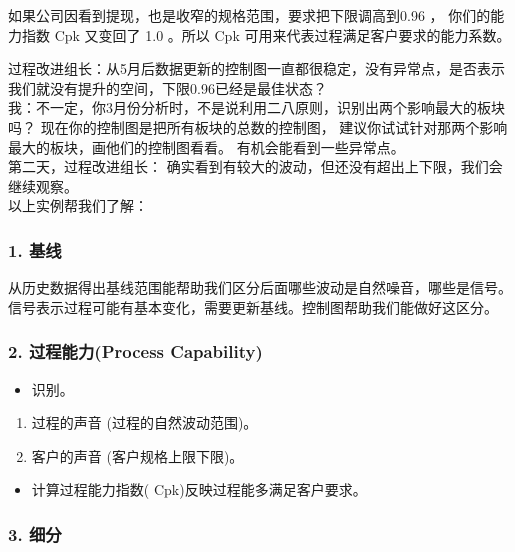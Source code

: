 如果公司因看到提现，也是收窄的规格范围，要求把下限调高到0.96 ，
你们的能力指数 Cpk 又变回了 1.0 。所以 Cpk
可用来代表过程满足客户要求的能力系数。

过程改进组长：从5月后数据更新的控制图一直都很稳定，没有异常点，是否表示我们就没有提升的空间，下限0.96已经是最佳状态？\\
我：不一定，你3月份分析时，不是说利用二八原则，识别出两个影响最大的板块吗？
现在你的控制图是把所有板块的总数的控制图，
建议你试试针对那两个影响最大的板块，画他们的控制图看看。
有机会能看到一些异常点。\\
第二天，过程改进组长：
确实看到有较大的波动，但还没有超出上下限，我们会继续观察。\\
以上实例帮我们了解：

\hypertarget{ux57faux7ebf}{%
\subsubsection{1. 基线}\label{ux57faux7ebf}}

从历史数据得出基线范围能帮助我们区分后面哪些波动是自然噪音，哪些是信号。
信号表示过程可能有基本变化，需要更新基线。控制图帮助我们能做好这区分。

\hypertarget{ux8fc7ux7a0bux80fdux529bprocess-capability}{%
\subsubsection{2. 过程能力(Process
Capability)}\label{ux8fc7ux7a0bux80fdux529bprocess-capability}}

\begin{itemize}
\tightlist
\item
  识别。
\end{itemize}

\begin{enumerate}
\tightlist
\item
  过程的声音 (过程的自然波动范围)。
\item
  客户的声音 (客户规格上限下限)。
\end{enumerate}

\begin{itemize}
\tightlist
\item
  计算过程能力指数( Cpk)反映过程能多满足客户要求。
\end{itemize}

\hypertarget{ux7ec6ux5206}{%
\subsubsection{3. 细分}\label{ux7ec6ux5206}}

